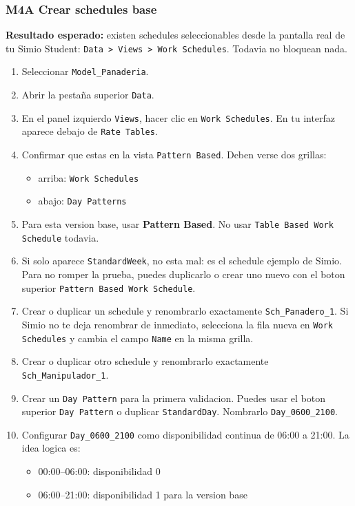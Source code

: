 \documentclass[11pt]{article}
\newcommand{\simio}[1]{\texttt{#1}}
\begin{document}
\subsubsection{M4A Crear schedules base}
\textbf{Resultado esperado:} existen schedules seleccionables desde la pantalla real de tu Simio Student: \simio{Data > Views > Work Schedules}. Todavia no bloquean nada.

\begin{enumerate}
  \item Seleccionar \simio{Model\_Panaderia}.
  \item Abrir la pesta\~na superior \simio{Data}.
  \item En el panel izquierdo \simio{Views}, hacer clic en \simio{Work Schedules}. En tu interfaz aparece debajo de \simio{Rate Tables}.
  \item Confirmar que estas en la vista \simio{Pattern Based}. Deben verse dos grillas:
  \begin{itemize}
    \item arriba: \simio{Work Schedules}
    \item abajo: \simio{Day Patterns}
  \end{itemize}
  \item Para esta version base, usar \textbf{Pattern Based}. No usar \simio{Table Based Work Schedule} todavia.
  \item Si solo aparece \simio{StandardWeek}, no esta mal: es el schedule ejemplo de Simio. Para no romper la prueba, puedes duplicarlo o crear uno nuevo con el boton superior \simio{Pattern Based Work Schedule}.
  \item Crear o duplicar un schedule y renombrarlo exactamente \simio{Sch\_Panadero\_1}. Si Simio no te deja renombrar de inmediato, selecciona la fila nueva en \simio{Work Schedules} y cambia el campo \simio{Name} en la misma grilla.
  \item Crear o duplicar otro schedule y renombrarlo exactamente \simio{Sch\_Manipulador\_1}.
  \item Crear un \simio{Day Pattern} para la primera validacion. Puedes usar el boton superior \simio{Day Pattern} o duplicar \simio{StandardDay}. Nombrarlo \simio{Day\_0600\_2100}.
  \item Configurar \simio{Day\_0600\_2100} como disponibilidad continua de 06:00 a 21:00. La idea logica es:
  \begin{itemize}
    \item 00:00--06:00: disponibilidad 0
    \item 06:00--21:00: disponibilidad 1 para la version base

\end{itemize}
\end{enumerate}
\end{document}
